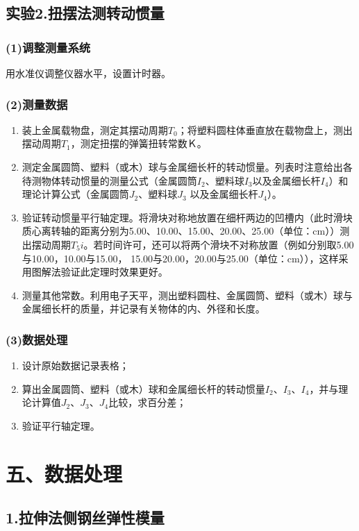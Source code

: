 \documentclass[11pt,a4paper,oneside]{article}
\begin{document}
\subsection*{实验2.扭摆法测转动惯量}
\subsubsection*{(1)调整测量系统}
用水准仪调整仪器水平，设置计时器。
\subsubsection*{(2)测量数据}
\begin{enumerate}
\item 装上金属载物盘，测定其摆动周期$T_0$；将塑料圆柱体垂直放在载物盘上，测出摆动周期$T_1$，测定扭摆的弹簧扭转常数Ｋ。
\item 测定金属圆筒、塑料（或木）球与金属细长杆的转动惯量。列表时注意给出各待测物体转动惯量的测量公式（金属圆筒$I_2$、塑料球$I_3$以及金属细长杆$I_4$）和理论计算公式（金属圆筒$J_2$、塑料球$J_3$ 以及金属细长杆$J_4$）。
\item 验证转动惯量平行轴定理。将滑块对称地放置在细杆两边的凹槽内（此时滑块质心离转轴的距离分别为5.00、10.00、15.00、20.00、25.00（单位：cm））测出摆动周期$T_5i$。若时间许可，还可以将两个滑块不对称放置（例如分别取5.00与10.00，10.00与15.00，
15.00与20.00，20.00与25.00（单位：cm）），这样采用图解法验证此定理时效果更好。
\item 测量其他常数。利用电子天平，测出塑料圆柱、金属圆筒、塑料（或木）球与金属细长杆的质量，并记录有关物体的内、外径和长度。
\end{enumerate}
\subsubsection*{(3)数据处理}
\begin{enumerate}
\item 设计原始数据记录表格；
\item 算出金属圆筒、塑料（或木）球和金属细长杆的转动惯量$I_2$、$I_3$、$I_4$，并与理论计算值$J_2$、$J_3$、$J_4$比较，求百分差；
\item 验证平行轴定理。
\end{enumerate}
\section{五、数据处理}
\subsection{1.拉伸法侧钢丝弹性模量}
\end{document}
